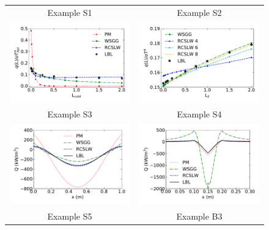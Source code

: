 \documentclass[preprint,12pt]{elsarticle}
\begin{document}
\begin{figure}
    \begin{center}
    \begin{tabular}{c c}
        Example S1 & Example S2 \\
        \includegraphics[width=2.75 in]{fig_ex_S1.pdf} &
        \includegraphics[width=2.75 in]{fig_ex_S2b.pdf} \\
        Example S3 & Example S4 \\
        \includegraphics[width=2.75 in]{fig_ex_S3a.pdf} &
        \includegraphics[width=2.75 in]{fig_ex_S4a.pdf} \\
        Example S5 & Example B3 \\

\end{tabular}
\end{center}
\end{figure}
\end{document}
